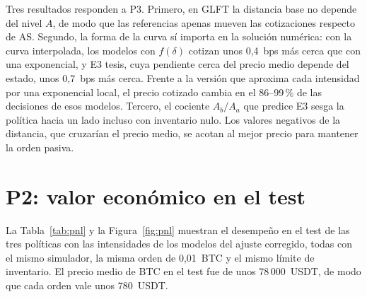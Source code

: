 Tres resultados responden a P3. Primero, en GLFT la distancia base no depende del nivel $A$, de modo que las referencias apenas mueven las cotizaciones respecto de AS. Segundo, la forma de la curva sí importa en la solución numérica: con la curva interpolada, los modelos con $f(\delta)$ cotizan unos 0,4~bps más cerca que con una exponencial, y E3 tesis, cuya pendiente cerca del precio medio depende del estado, unos 0,7~bps más cerca. Frente a la versión que aproxima cada intensidad por una exponencial local, el precio cotizado cambia en el 86--99\,\% de las decisiones de esos modelos. Tercero, el cociente $A_b/A_a$ que predice E3 sesga la política hacia un lado incluso con inventario nulo. Los valores negativos de la distancia, que cruzarían el precio medio, se acotan al mejor precio para mantener la orden pasiva.

\section{P2: valor económico en el test}
\label{sec:p2}
La Tabla~\ref{tab:pnl} y la Figura~\ref{fig:pnl} muestran el desempeño en el test de las tres políticas con las intensidades de los modelos del ajuste corregido, todas con el mismo simulador, la misma orden de 0,01~BTC y el mismo límite de inventario. El precio medio de BTC en el test fue de unos 78\,000~USDT, de modo que cada orden vale unos 780~USDT.

